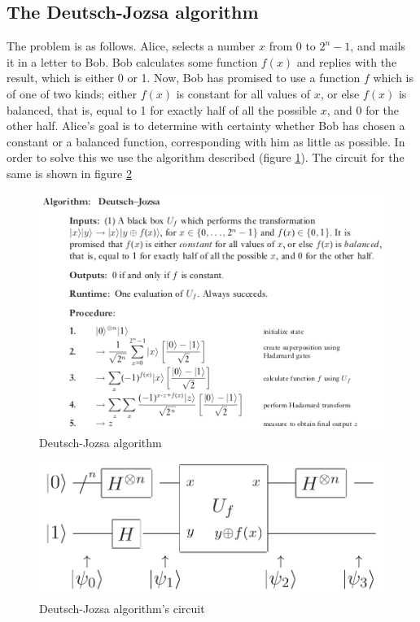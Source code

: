 \documentclass[conference]{IEEEtran}
\begin{document}
\subsection{The Deutsch-Jozsa algorithm}
The problem is as follows. Alice, selects a number $x$ from $0$ to $2^n - 1$, and mails it in a letter to Bob. Bob calculates some function
$f(x)$ and replies with the result, which is either 0 or 1. Now, Bob has promised to use
a function $f$ which is of one of two kinds; either $f(x)$ is constant for all values of $x$,
or else $f(x)$ is balanced, that is, equal to 1 for exactly half of all the possible $x$, and 0
for the other half. Alice's goal is to determine with certainty whether Bob has chosen a
constant or a balanced function, corresponding with him as little as possible. In order to solve this we use the algorithm described (figure \ref{dj-algo}). 
The circuit for the same is shown in figure \ref{dj-ckt}
\begin{figure}[htbp]
\centerline{\includegraphics[scale = 0.5]{Images/deutch-algo.png}}
\caption{Deutsch-Jozsa algorithm}
\label{dj-algo}
\end{figure}

\begin{figure}[htbp]
\centerline{\includegraphics[scale = 0.5]{Images/deutch-ckt.png}}
\caption{Deutsch-Jozsa algorithm's circuit}
\label{dj-ckt}
\end{figure}
\end{document}

